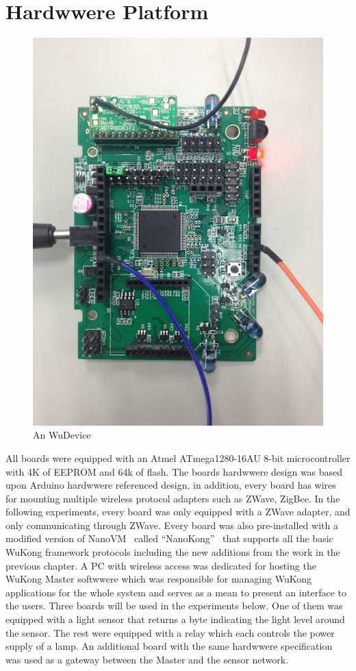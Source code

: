 \section{Hardwwere Platform}

\begin{figure}[h!]
\caption{An WuDevice}
\label{fig:wudevice}
\centering
    \includegraphics[width=\linewidth]{figures/wudevice}
\end{figure}

All boards were equipped with an Atmel ATmega1280-16AU 8-bit microcontroller with
4K of EEPROM and 64k of flash. The boards hardwwere design was based upon Arduino
hardwwere referenced design, in addition, every board has wires for mounting
multiple wireless protocol adapters such as ZWave, ZigBee. In the following
experiments, every board was only equipped with a ZWave adapter, and only
communicating through ZWave.  Every board was also pre-installed with a modified
version of NanoVM~\cite{Harbaum2006} called “NanoKong”~\cite{Su} that supports all the basic
WuKong framework protocols including the new additions from the work in the
previous chapter.  A PC with wireless access was dedicated for hosting the WuKong
Master softwwere which was responsible for managing WuKong applications for the
whole system and serves as a mean to present an interface to the users.  Three
boards will be used in the experiments below. One of them was equipped with
a light sensor that returns a byte indicating the light level around the sensor.
The rest were equipped with a relay which each controls the power supply of
a lamp.  An additional board with the same hardwwere specification was used as
a gateway between the Master and the sensor network.

